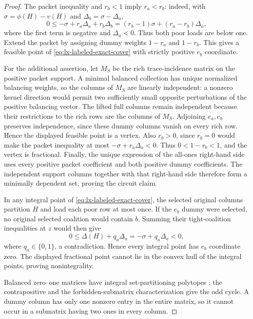\begin{proof}
The packet inequality and $r_b<1$ imply $r_a<r_b$: indeed, with
$\sigma=\phi(H)-v(H)$ and $\Delta_b=\sigma-\Delta_a$,
\[
 0\leq-\sigma+r_a\Delta_a+r_b\Delta_b
   =(r_b-1)\sigma+(r_a-r_b)\Delta_a,
\]
where the first term is negative and $\Delta_a<0$.  Thus both poor loads
are below one.  Extend the packet by assigning dummy weights $1-r_a$ and
$1-r_b$.  This gives a feasible point of
\eqref{eq:lx-labeled-exact-cover} with strictly positive $e_b$ coordinate.

For the additional assertion, let $M_S$ be the rich trace-incidence matrix
on the positive packet support.  A minimal balanced collection has unique
normalized balancing weights, so the columns of $M_S$ are linearly
independent: a nonzero kernel direction would permit two sufficiently small
opposite perturbations of the positive balancing vector.  The lifted full
columns remain independent because their restrictions to the rich rows are
the columns of $M_S$.  Adjoining $e_a,e_b$ preserves independence, since
these dummy columns vanish on every rich row.  Hence the displayed feasible
point is a vertex.  Also $r_b>0$, since $r_b=0$ would make the packet
inequality at most $-\sigma+r_a\Delta_a<0$.  Thus
$0<1-r_b<1$, and the vertex is fractional.  Finally, the unique expression
of the all-ones right-hand side uses every positive packet coefficient and
both positive dummy coefficients.  The independent support columns together
with that right-hand side therefore form a minimally dependent set, proving
the circuit claim.

In any integral point of \eqref{eq:lx-labeled-exact-cover}, the selected
original columns partition $H$ and load each poor row at most once.  If the
$e_b$ dummy were selected, no original selected coalition would contain
$b$.  Summing their tight-coalition inequalities at $z$ would then give
\[
 0\leq\Delta(H)+q_a\Delta_a=-\sigma+q_a\Delta_a<0,
\]
where $q_a\in\{0,1\}$, a contradiction.  Hence every integral point has
$e_b$ coordinate zero.  The displayed fractional point cannot lie in the
convex hull of the integral points, proving nonintegrality.

Balanced zero--one matrices have integral set-partitioning polytopes
\citep{Berge1972}; the contrapositive and the forbidden-submatrix
characterization give the odd cycle.  A dummy column has only one nonzero
entry in the entire matrix, so it cannot occur in a submatrix having two
ones in every column.
\end{proof}


